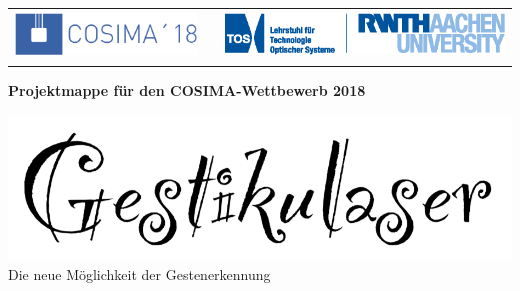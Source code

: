 
\begin{titlepage}

    
	\begin{table}[h!]
		\begin{tabular}{rp{5cm}l}
 		\includegraphics[height=1.25cm]{../Logos/Cosima18.png} & & \includegraphics[height=1.25cm]{../Logos/TOS.eps} \\
		\end{tabular}
	\end{table}
    
    \small
	\parindent0pt
	
	\begin{center}
		\bfseries Projektmappe für den COSIMA-Wettbewerb 2018
	\end{center}
	
	\vspace*{15mm}
	\normalsize	
	
	\begin{center}
		\includegraphics[scale=0.35]{../Logos/GestikulaserSchriftzugOhneHut.png}
		\\ \vspace*{4mm}
		\large
		Die neue Möglichkeit der Gestenerkennung
	\end{center}
	
	\vfill
	
	\begin{center}
	\large \mydate{\today}
	\end{center}
	

\end{titlepage}
